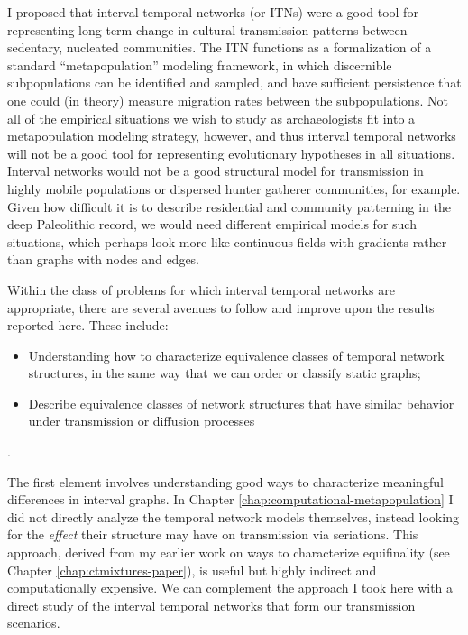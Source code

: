 I proposed that interval temporal networks (or ITNs) were a good tool for representing long term change in cultural transmission patterns between sedentary, nucleated communities.  The ITN functions as a formalization of a standard ``metapopulation'' modeling framework, in which discernible subpopulations can be identified and sampled, and have sufficient persistence that one could (in theory) measure migration rates between the subpopulations.  Not all of the empirical situations we wish to study as archaeologists fit into a metapopulation modeling strategy, however, and thus interval temporal networks will not be a good tool for representing evolutionary hypotheses in all situations.  Interval networks would not be a good structural model for transmission in highly mobile populations or dispersed hunter gatherer communities, for example.  Given how difficult it is to describe residential and community patterning in the deep Paleolithic record, we would need different empirical models for such situations, which perhaps look more like continuous fields with gradients rather than graphs with nodes and edges. 

Within the class of problems for which interval temporal networks are appropriate, there are several avenues to follow and improve upon the results reported here.  These include:

\begin{itemize}
    \item Understanding how to characterize equivalence classes of temporal network structures, in the same way that we can order or classify static graphs;
    \item Describe equivalence classes of network structures that have similar behavior under transmission or diffusion processes
\end{itemize}.

The first element involves understanding good ways to characterize meaningful differences in interval graphs.  In Chapter \ref{chap:computational-metapopulation} I did not directly analyze the temporal network models themselves, instead looking for the \emph{effect} their structure may have on transmission via seriations.  This approach, derived from my earlier work on ways to characterize equifinality (see Chapter \ref{chap:ctmixtures-paper}), is useful but highly indirect and computationally expensive.  We can complement the approach I took here with a direct study of the interval temporal networks that form our transmission scenarios.  

